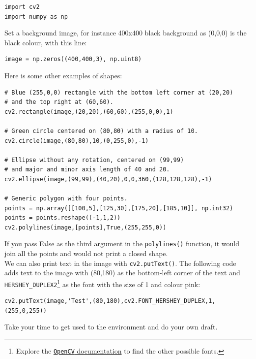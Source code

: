 \documentclass{labo}
\newcommand{\opencv}{\texttt{OpenCV} }
\begin{document}
\begin{verbatim}
import cv2
import numpy as np
\end{verbatim}

Set a background image, for instance 400x400 black background as (0,0,0) is the black colour, with this line:

\begin{verbatim}
image = np.zeros((400,400,3), np.uint8)
\end{verbatim}

Here is some other examples of shapes:

\begin{verbatim}
# Blue (255,0,0) rectangle with the bottom left corner at (20,20)
# and the top right at (60,60).
cv2.rectangle(image,(20,20),(60,60),(255,0,0),1)

# Green circle centered on (80,80) with a radius of 10.
cv2.circle(image,(80,80),10,(0,255,0),-1)

# Ellipse without any rotation, centered on (99,99)
# and major and minor axis length of 40 and 20.
cv2.ellipse(image,(99,99),(40,20),0,0,360,(128,128,128),-1)

# Generic polygon with four points.
points = np.array([[100,5],[125,30],[175,20],[185,10]], np.int32)
points = points.reshape((-1,1,2))
cv2.polylines(image,[points],True,(255,255,0))
\end{verbatim}

If you pass False as the third argument in the \texttt{polylines()} function, it would join all the points and would not print a closed shape.\\

We can also print text in the image with \texttt{cv2.putText()}. The following code adds text to the image with (80,180) as the bottom-left corner of the text and \texttt{HERSHEY\_DUPLEX2}\footnote{Explore the \href{https://docs.opencv.org/4.x/}{\opencv documentation} to find the other possible fonts.} as the font with the size of 1 and colour pink:

\begin{verbatim}
cv2.putText(image,'Test',(80,180),cv2.FONT_HERSHEY_DUPLEX,1,(255,0,255))
\end{verbatim}

Take your time to get used to the environment and do your own draft.
\end{document}
